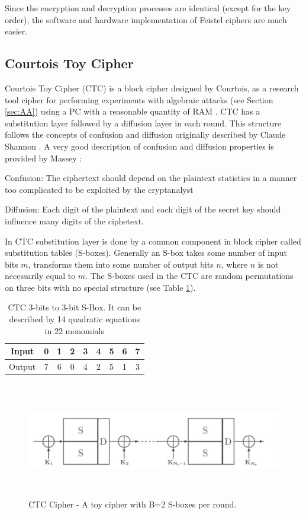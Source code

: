 Since the encryption and decryption processes are identical (except for the key order), the software and hardware implementation of Feistel ciphers are much easier.

\subsection{Courtois Toy Cipher}
Courtois Toy Cipher (CTC) is a block cipher designed by Courtois, as a research tool
cipher for performing experiments with algebraic attacks (see Section \ref{sec:AA}) using a PC with a reasonable quantity of RAM \cite{FastAlg}.
CTC has a substitution layer followed by a diffusion layer in each round. This structure follows the concepts of confusion and diffusion originally described by Claude
Shannon \cite{shannon1949communication}. A very good description of confusion and diffusion properties is
provided by Massey \cite{kaliski1995montgomery}:

Confusion: The ciphertext should depend on the plaintext statistics in a manner
too complicated to be exploited by the cryptanalyst

Diffusion: Each digit of the plaintext and each digit of the secret key should
influence many digits of the ciphetext.

In CTC substitution layer is done by a common component in block cipher called substitution tables (S-boxes). Generally an S-box takes some number of input bits $m$, transforms them into some number of output bits $n$, where $n$ is not necessarily equal to $m$. The S-boxes used in the CTC are random
permutations on three bits with no special structure (see Table \ref{tab:CTCSBox}).

\begin{table}[!h]
	\centering
	\caption[CTC S-Box]{CTC 3-bits to 3-bit S-Box. It can be described by 14 quadratic equations in 22 monomials \cite{FastAlg}}
	\label{tab:CTCSBox}
	\begin{tabular}{|c|c c c c c c c c|}
		\hline
		Input & 0 & 1 & 2 & 3 & 4 & 5 & 6 & 7   \\ \hline
	    Output & 7 & 6 & 0 & 4 & 2 & 5 & 1 & 3   \\ \hline
	\end{tabular}
\end{table}


\begin{figure}[h!]
	\centering
	\includegraphics[width=150mm,height=50mm]{./pics/CTC_round_function.png}
	\caption[CTC Cipher]{CTC Cipher - A toy cipher with B=2 S-boxes per round.}
	\label{Fig:CTCRound}
\end{figure}


